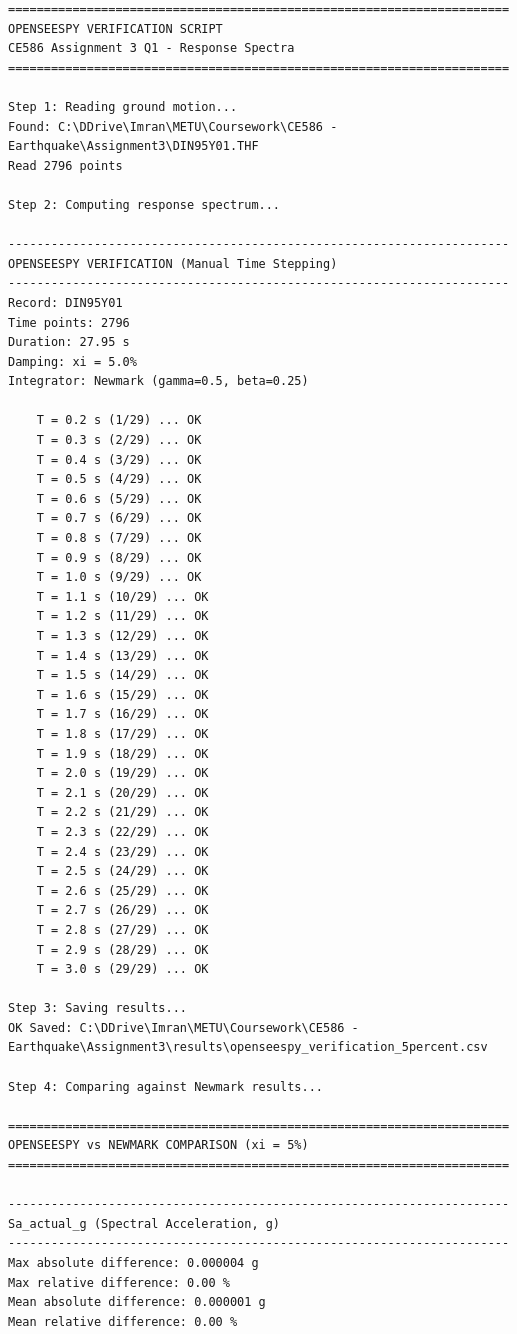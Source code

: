 ﻿\documentclass[12pt]{article}
\begin{document}
\begin{Verbatim}[fontsize=\scriptsize]
======================================================================
OPENSEESPY VERIFICATION SCRIPT
CE586 Assignment 3 Q1 - Response Spectra
======================================================================

Step 1: Reading ground motion...
Found: C:\DDrive\Imran\METU\Coursework\CE586 - Earthquake\Assignment3\DIN95Y01.THF
Read 2796 points

Step 2: Computing response spectrum...

----------------------------------------------------------------------
OPENSEESPY VERIFICATION (Manual Time Stepping)
----------------------------------------------------------------------
Record: DIN95Y01
Time points: 2796
Duration: 27.95 s
Damping: xi = 5.0%
Integrator: Newmark (gamma=0.5, beta=0.25)

    T = 0.2 s (1/29) ... OK
    T = 0.3 s (2/29) ... OK
    T = 0.4 s (3/29) ... OK
    T = 0.5 s (4/29) ... OK
    T = 0.6 s (5/29) ... OK
    T = 0.7 s (6/29) ... OK
    T = 0.8 s (7/29) ... OK
    T = 0.9 s (8/29) ... OK
    T = 1.0 s (9/29) ... OK
    T = 1.1 s (10/29) ... OK
    T = 1.2 s (11/29) ... OK
    T = 1.3 s (12/29) ... OK
    T = 1.4 s (13/29) ... OK
    T = 1.5 s (14/29) ... OK
    T = 1.6 s (15/29) ... OK
    T = 1.7 s (16/29) ... OK
    T = 1.8 s (17/29) ... OK
    T = 1.9 s (18/29) ... OK
    T = 2.0 s (19/29) ... OK
    T = 2.1 s (20/29) ... OK
    T = 2.2 s (21/29) ... OK
    T = 2.3 s (22/29) ... OK
    T = 2.4 s (23/29) ... OK
    T = 2.5 s (24/29) ... OK
    T = 2.6 s (25/29) ... OK
    T = 2.7 s (26/29) ... OK
    T = 2.8 s (27/29) ... OK
    T = 2.9 s (28/29) ... OK
    T = 3.0 s (29/29) ... OK

Step 3: Saving results...
OK Saved: C:\DDrive\Imran\METU\Coursework\CE586 - Earthquake\Assignment3\results\openseespy_verification_5percent.csv

Step 4: Comparing against Newmark results...

======================================================================
OPENSEESPY vs NEWMARK COMPARISON (xi = 5%)
======================================================================

----------------------------------------------------------------------
Sa_actual_g (Spectral Acceleration, g)
----------------------------------------------------------------------
Max absolute difference: 0.000004 g
Max relative difference: 0.00 %
Mean absolute difference: 0.000001 g
Mean relative difference: 0.00 %


\end{Verbatim}
\end{document}
